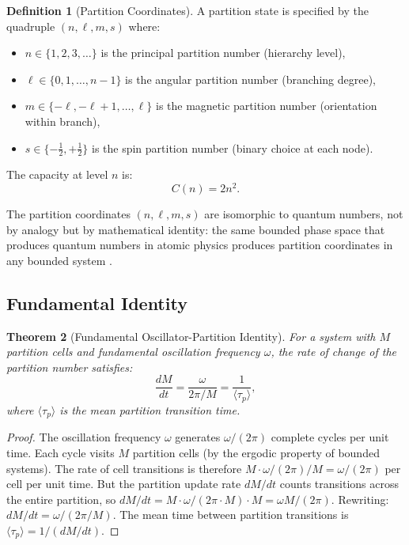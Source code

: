 \documentclass[twocolumn,10pt]{article}
\newtheorem{theorem}{Theorem}[section]
\theoremstyle{definition}
\newtheorem{definition}[theorem]{Definition}
\theoremstyle{remark}
\begin{document}
\begin{definition}[Partition Coordinates]
\label{def:partition_coords}
A partition state is specified by the quadruple $(n, \ell, m, s)$ where:
\begin{itemize}
  \item $n \in \{1, 2, 3, \ldots\}$ is the principal partition number (hierarchy level),
  \item $\ell \in \{0, 1, \ldots, n-1\}$ is the angular partition number (branching degree),
  \item $m \in \{-\ell, -\ell+1, \ldots, \ell\}$ is the magnetic partition number (orientation within branch),
  \item $s \in \{-\tfrac{1}{2}, +\tfrac{1}{2}\}$ is the spin partition number (binary choice at each node).
\end{itemize}
The capacity at level $n$ is:
\begin{equation}
  C(n) = 2n^2.
  \label{eq:capacity}
\end{equation}
\end{definition}

The partition coordinates $(n, \ell, m, s)$ are isomorphic to quantum numbers, not by analogy but by mathematical identity: the same bounded phase space that produces quantum numbers in atomic physics produces partition coordinates in any bounded system \cite{sachikonye2026partition, sachikonye2026single}.

\subsection{Fundamental Identity}

\begin{theorem}[Fundamental Oscillator-Partition Identity]
\label{thm:fundamental_identity}
For a system with $M$ partition cells and fundamental oscillation frequency $\omega$, the rate of change of the partition number satisfies:
\begin{equation}
  \frac{dM}{dt} = \frac{\omega}{2\pi/M} = \frac{1}{\langle \tau_p \rangle},
  \label{eq:fundamental_identity}
\end{equation}
where $\langle \tau_p \rangle$ is the mean partition transition time.
\end{theorem}

\begin{proof}
The oscillation frequency $\omega$ generates $\omega/(2\pi)$ complete cycles per unit time. Each cycle visits $M$ partition cells (by the ergodic property of bounded systems). The rate of cell transitions is therefore $M \cdot \omega/(2\pi) / M = \omega/(2\pi)$ per cell per unit time. But the partition update rate $dM/dt$ counts transitions across the entire partition, so $dM/dt = M \cdot \omega/(2\pi \cdot M) \cdot M = \omega M/(2\pi)$. Rewriting: $dM/dt = \omega/(2\pi/M)$. The mean time between partition transitions is $\langle \tau_p \rangle = 1/(dM/dt)$.
\end{proof}
\end{document}

